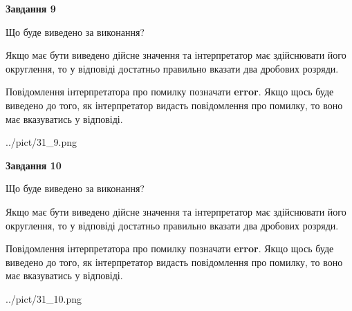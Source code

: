 \documentclass[12pt, ukrainian]{article}
\begin{document}
{\begin {Large}
{\begin {center}\textbf{Завдання 9}\end {center}}\par
Що буде виведено за виконання? \par

Якщо має бути виведено дійсне значення та інтерпретатор має здійснювати його округлення, 
то у відповіді достатньо правильно вказати два дробових розряди.

Повідомлення інтерпретатора про помилку позначати \textbf{error}.
Якщо щось буде виведено до того, як інтерпретатор видасть повідомлення про помилку, 
то воно має вказуватись у відповіді. \par

\begin{center}
	{../pict/31_9.png}
\end{center}
\newpage

{\begin {center}\textbf{Завдання 10}\end {center}}\par
Що буде виведено за виконання? \par

Якщо має бути виведено дійсне значення та інтерпретатор має здійснювати його округлення, 
то у відповіді достатньо правильно вказати два дробових розряди.

Повідомлення інтерпретатора про помилку позначати \textbf{error}.
Якщо щось буде виведено до того, як інтерпретатор видасть повідомлення про помилку, 
то воно має вказуватись у відповіді. \par

\begin{center}
	{../pict/31_10.png}
\end{center}
\newpage

\end {Large}}
\end{document}
